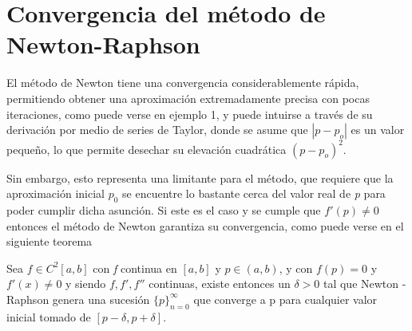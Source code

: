 \section{Convergencia del método de Newton-Raphson}

El método de Newton tiene una convergencia considerablemente rápida, permitiendo obtener una aproximación extremadamente precisa con pocas iteraciones, como puede verse en ejemplo 1, y puede intuirse a través de su derivación por medio de series de Taylor, donde se asume que $ | p - p_o | $ es un valor pequeño, lo que permite desechar su elevación cuadrática $(p-p_o)^2$.

Sin embargo, esto representa una limitante para el método, que requiere que la aproximación inicial $p_0$ se encuentre lo bastante cerca del valor real de \textit{p} para poder cumplir dicha asunción. Si este es el caso y se cumple que $f'(p) \neq 0$ entonces el método de Newton garantiza su convergencia, como puede verse en el siguiente teorema

\begin{theorem}
Sea $f \in C^2[a,b]$ con \textit{f} continua en $[a,b]$ y $p \in (a,b)$, y con $f(p) = 0$ y $f'(x) \neq 0$ y siendo $f,f', f''$ continuas, existe entonces un $\delta > 0$  tal que Newton - Raphson genera una sucesión $\{p\}^\infty_{n=0}$ que converge a p para cualquier valor inicial tomado de $[p-\delta, p+\delta]$.
\end{theorem}

